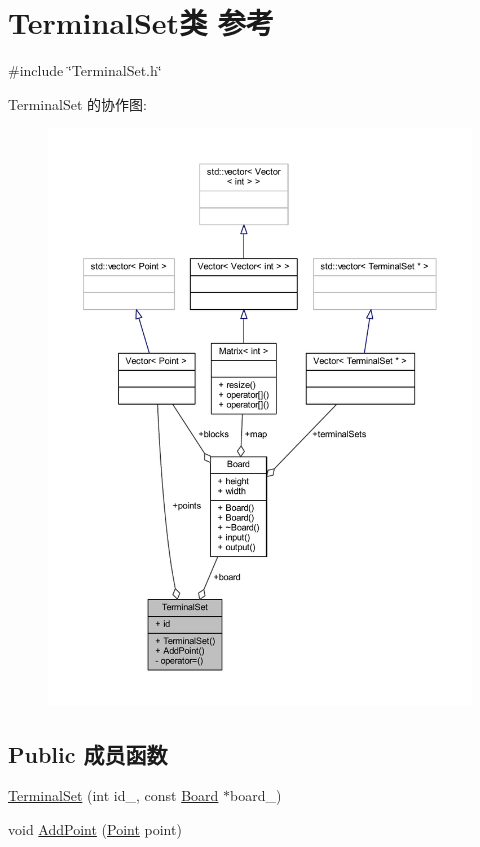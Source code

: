\hypertarget{classTerminalSet}{}\section{Terminal\+Set类 参考}
\label{classTerminalSet}


{\ttfamily \#include \char`\"{}Terminal\+Set.\+h\char`\"{}}



Terminal\+Set 的协作图\+:
\nopagebreak
\begin{figure}[H]
\begin{center}
\leavevmode
\includegraphics[width=350pt]{classTerminalSet__coll__graph}
\end{center}
\end{figure}
\subsection*{Public 成员函数}
\begin{DoxyCompactItemize}
\item 
\hyperlink{classTerminalSet_a50ddda52fed225eec22e1baa3163655d}{Terminal\+Set} (int id\+\_\+, const \hyperlink{classBoard}{Board} $\ast$board\+\_\+)
\item 
void \hyperlink{classTerminalSet_a405cff3b74573b5459da6ffd387f347a}{Add\+Point} (\hyperlink{classPoint}{Point} point)
\end{DoxyCompactItemize}
